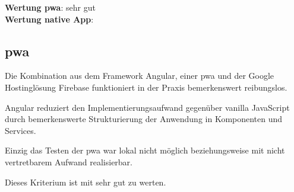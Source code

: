 \textbf{Wertung \ac{pwa}}: sehr gut\\
\textbf{Wertung native App}:  \\

\subsection{\ac{pwa}}
Die Kombination aus dem Framework Angular, einer \ac{pwa} und der Google Hostinglösung Firebase funktioniert in der Praxis bemerkenswert reibungslos.

Angular reduziert den Implementierungsaufwand gegenüber vanilla JavaScript durch bemerkenswerte Strukturierung der Anwendung in Komponenten und Services.

Einzig das Testen der \ac{pwa} war lokal nicht möglich beziehungsweise mit nicht vertretbarem Aufwand realisierbar.

Dieses Kriterium ist mit sehr gut zu werten.